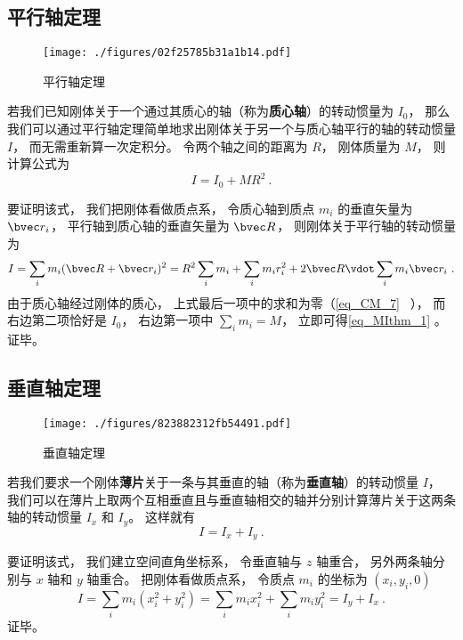 

\subsection{平行轴定理}
\begin{figure}[ht]
\centering
\texttt{[image: ./figures/02f25785b31a1b14.pdf]}
\caption{平行轴定理} \label{fig_MIthm_1}
\end{figure}

若我们已知刚体关于一个通过其质心的轴（称为\textbf{质心轴}）的转动惯量为 $I_0$， 那么我们可以通过平行轴定理简单地求出刚体关于另一个与质心轴平行的轴的转动惯量 $I$， 而无需重新算一次定积分。 令两个轴之间的距离为 $R$， 刚体质量为 $M$， 则计算公式为%
\begin{equation}\label{eq_MIthm_1}
I = I_0 + MR^2~.
\end{equation}

要证明该式， 我们把刚体看做质点系， 令质心轴到质点 $m_i$ 的垂直矢量为 $\bvec r_i$， 平行轴到质心轴的垂直矢量为 $\bvec R$， 则刚体关于平行轴的转动惯量为
\begin{equation}
I = \sum_i m_i (\bvec R + \bvec r_i)^2 = R^2\sum_i m_i + \sum_i m_i r_i^2 + 2\bvec R \vdot \sum_i m_i \bvec r_i~.
\end{equation}
由于质心轴经过刚体的质心， 上式最后一项中的求和为零（\autoref{eq_CM_7}~ ）， 而右边第二项恰好是 $I_0$， 右边第一项中 $\sum_i m_i = M$， 立即可得\autoref{eq_MIthm_1} 。 证毕。


\subsection{垂直轴定理}
\begin{figure}[ht]
\centering
\texttt{[image: ./figures/823882312fb54491.pdf]}
\caption{垂直轴定理} \label{fig_MIthm_2}
\end{figure}
若我们要求一个刚体\textbf{薄片}关于一条与其垂直的轴（称为\textbf{垂直轴}）的转动惯量 $I$， 我们可以在薄片上取两个互相垂直且与垂直轴相交的轴并分别计算薄片关于这两条轴的转动惯量 $I_x$ 和 $I_y$。 这样就有
\begin{equation}\label{eq_MIthm_2}
I = I_x + I_y~.
\end{equation}

要证明该式， 我们建立空间直角坐标系， 令垂直轴与 $z$ 轴重合， 另外两条轴分别与 $x$ 轴和 $y$ 轴重合。 把刚体看做质点系， 令质点 $m_i$ 的坐标为 $(x_i, y_i, 0)$
\begin{equation}
I = \sum_i m_i (x_i^2 + y_i^2) = \sum_i m_i x_i^2 + \sum_i m_i y_i^2 = I_y + I_x~.
\end{equation}
证毕。

